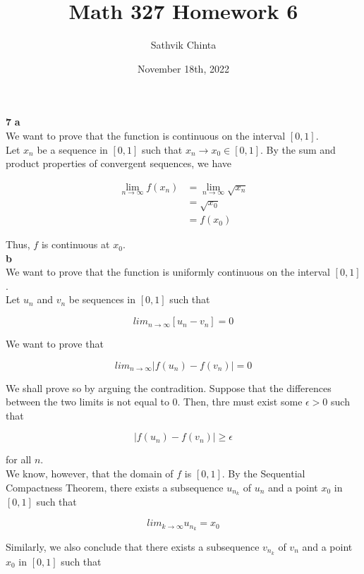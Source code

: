 \documentclass[addpoints]{exam}
\title{Math 327 Homework 6}
\author{Sathvik Chinta}
\date{November 18th, 2022}
\begin{document}
\maketitle

\begin{questions}
\question \textbf{7} \textbf{a}\\

We want to prove that the function is continuous on the interval $[0,1]$.\\

Let ${x_n}$ be a sequence in $[0,1]$ such that $x_n \to x_0 \in [0, 1]$. By the sum and product properties of convergent
sequences, we have

\begin{align*}
\lim_{n \to \infty} f(x_n) &= \lim_{n \to \infty} \sqrt{x_n}\\
&= \sqrt{x_0} \\ 
&= f(x_0)
\end{align*}

Thus, $f$ is continuous at $x_0$.\\

\textbf{b}\\

We want to prove that the function is uniformly continuous on the interval $[0,1]$.\\

Let ${u_n}$ and ${v_n}$ be sequences in $[0, 1]$ such that

\[lim_{n \to \infty} [u_n - v_n] = 0\]

We want to prove that 

\[lim_{n \to \infty} |f(u_n) - f(v_n)| = 0\]

We shall prove so by arguing the contradition. Suppose that the differences between the two limits is not equal
to 0. Then, thre must exist some $\epsilon > 0$ such that

\[|f(u_n) - f(v_n)| \geq \epsilon\]

for all $n$.\\

We know, however, that the domain of $f$ is $[0, 1]$. By the Sequential Compactness Theorem,
there exists a subsequence ${u_{n_k}}$ of ${u_{n}}$ and a point $x_0$ in $[0, 1]$ such that

\[lim_{k \to \infty} u_{n_k} = x_0\]

Similarly, we also conclude that there exists a subsequence ${v_{n_k}}$ of ${v_{n}}$ and a 
point $x_0$ in $[0, 1]$ such that


\end{questions}
\end{document}
